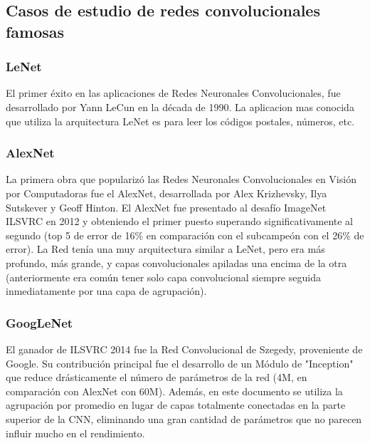 \documentclass[a4paper,11pt,spanish]{book}
\begin{document}
    \subsection {Casos de estudio de redes convolucionales famosas}

      \subsubsection{LeNet}
	 El primer éxito en las aplicaciones de Redes Neuronales Convolucionales, fue desarrollado por Yann LeCun en la década de 1990. La aplicacion mas conocida que utiliza la arquitectura
	 LeNet es para leer los códigos postales, números, etc.

      \subsubsection{AlexNet}
	La primera obra que popularizó las Redes Neuronales Convolucionales en Visión por Computadoras fue el AlexNet, desarrollada por Alex Krizhevsky, Ilya Sutskever y Geoff Hinton.
	El AlexNet fue presentado al desafío ImageNet ILSVRC  en 2012 y obteniendo el primer puesto superando significativamente al segundo (top 5 de error de 16\% en comparación con el
	subcampeón con el 26\% de error). La Red tenía una muy arquitectura similar a LeNet, pero era más profundo, más grande, y capas convolucionales apiladas una encima de la otra
	(anteriormente era común tener solo capa convolucional siempre seguida inmediatamente por una capa de agrupación).

      \subsubsection{GoogLeNet}
	El ganador de ILSVRC 2014 fue la Red Convolucional de Szegedy, proveniente de Google. Su contribución principal fue el desarrollo de un Módulo de "Inception" que reduce drásticamente
	el número de parámetros de la red (4M, en comparación con AlexNet con 60M). Además, en este documento se utiliza la agrupación por promedio en lugar de capas totalmente conectadas
	en la parte superior de la CNN, eliminando una gran cantidad de parámetros que no parecen influir mucho en el rendimiento.
\end{document}

